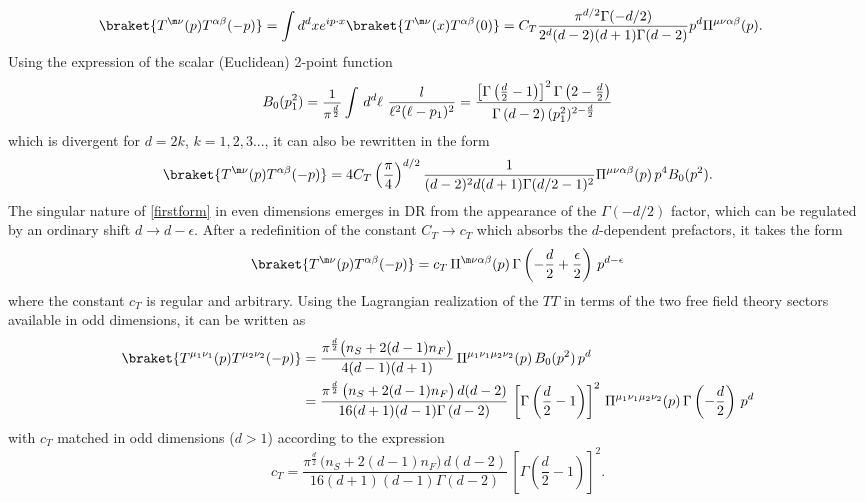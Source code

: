 \documentclass[a4paper,11pt,openright,twoside]{book}
\let\n=\nu      \let\x=\xi     \let\p=\pi      \let\r=\rho
\newcommand{\sdfrac}[2]{\mbox{\small$\displaystyle\frac{#1}{#2}$}}
\numberwithin{equation}{section}
\begin{document}
{{\begin{align}
	\label{firstform}
	\braket{T^{\m\n}(p)T^{\alpha\beta}(-p)}&=\int d^d x e^{i p\cdot x} 
	\braket{T^{\m\n}(x)T^{\alpha\beta}(0)}=C_T \frac{ \pi^{d/2} \Gamma(-d/2)}{2^d (d-2)(d+1)\Gamma(d-2) }p^d 
	\Pi^{\mu\nu\alpha\beta}(p).  
\end{align}
Using the expression of the scalar (Euclidean) 2-point function 
\begin{equation}
	{B}_0(p_1^2)=\sdfrac{1}{\p^\frac{d}{2}}\int\,d^d \ell\ \frac{l}{\ell^2(\ell-p_1)^2}=\frac{ \left[\Gamma\left(\frac{d}{2}-1\right)\right]^2\Gamma\left(2-\frac{d}{2}\right)}{\Gamma\left(d-2\right)(p_1^2)^{2-\frac{d}{2}}}\label{B0ex}
\end{equation}
which is divergent for $d=2 k $, $k=1,2,3...$, it can also be rewritten in the form 
\begin{equation}
	\braket{T^{\m\n}(p)T^{\alpha\beta}(-p)}=4 C_T \left(\frac{\pi}{4}\right)^{d/2} \frac{1}{(d-2)^2 d (d+1)\Gamma(d/2-1)^2}\Pi^{\mu\nu\alpha\beta}(p)\, p^4  B_0(p^2).
\end{equation}
The singular nature of \eqref{firstform} in even dimensions emerges in DR from the appearance of the
$\Gamma(-d/2)$ factor, which can be regulated by an ordinary shift $d\to d- \epsilon$. After a redefinition of the constant $C_T\to c_T$ which absorbs the $d$-dependent prefactors, it takes the form 
\begin{align}
	\label{general}
	\braket{T^{\m\n}(p)T^{\alpha\beta}(-p)}=c_T\,\Pi^{\m\n\alpha\beta}(p)\,\Gamma\left(-\frac{d}{2}+\frac{\epsilon}{2}\right)\,p^{d- \epsilon}
\end{align}
where the constant $c_T$ is regular and arbitrary. Using the Lagrangian realization of the $TT$ in terms of the two free field theory sectors available in odd dimensions, it can be written as
\begin{align}
	\label{fform}
	\braket{T^{\mu_1\nu_1}(p)T^{\mu_2\nu_2}(-p)}&=\frac{\p^\frac{d}{2}\big(n_S+2(d-1)n_F\big)}{4(d-1)(d+1)}\,\Pi^{\mu_1\nu_1\mu_2\nu_2}(p)\,{B}_0(p^2)\,p^d\notag\\
	&=\frac{\p^\frac{d}{2}\,\big(n_S+2(d-1)n_F\big)\,d(d-2)}{16(d+1)(d-1)\Gamma\left(d-2\right)}\,\left[\Gamma\left(\frac{d}{2}-1\right)\right]^2\,\Pi^{\mu_1\nu_1\mu_2\nu_2}(p)\,\Gamma\left(-\frac{d}{2}\right)\,p^d
\end{align}
with $c_T$ matched in odd dimensions ($d>1$) according to the expression
\begin{equation}
	c_T=\frac{\p^\frac{d}{2}\,\big(n_S+2(d-1)n_F\big)\,d(d-2)}{16(d+1)(d-1)\Gamma\left(d-2\right)}\,\left[\Gamma\left(\frac{d}{2}-1\right)\right]^2.

\end{equation}}}
\end{document}
